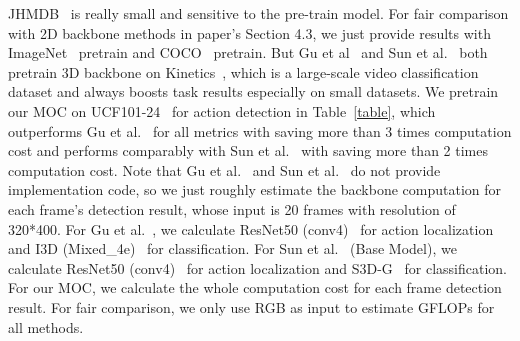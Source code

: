 \documentclass[runningheads]{llncs}
\begin{document}
JHMDB~\cite{JHMDB} is really small and sensitive to the pre-train model. For fair comparison with 2D backbone methods in paper's Section 4.3, we just provide results with ImageNet~\cite{deng2009imagenet} pretrain and COCO~\cite{lin2014microsoft} pretrain. But Gu et al~\cite{gu2018ava} and Sun et al.~\cite{SunSVMSS18} both pretrain 3D backbone on Kinetics~\cite{carreira2017quo}, which is a large-scale video classification dataset and always boosts task results especially on small datasets. We pretrain our MOC on UCF101-24~\cite{UCF101} for action detection in Table~\ref{table}, which outperforms Gu et al.~\cite{gu2018ava} for all metrics with saving more than 3 times computation cost and performs comparably with Sun et al.~\cite{SunSVMSS18} with saving more than 2 times computation cost. Note that Gu et al.~\cite{gu2018ava} and Sun et al.~\cite{SunSVMSS18} do not provide implementation code, so we just roughly estimate the backbone computation for each frame's detection result, whose input is 20 frames with resolution of 320*400. For Gu et al.~\cite{gu2018ava}, we calculate ResNet50 (conv4)~\cite{he2016deep} for action localization and I3D (Mixed\_4e)~\cite{carreira2017quo} for classification. For Sun et al.~\cite{SunSVMSS18} (Base Model), we calculate ResNet50 (conv4)~\cite{he2016deep} for action localization and S3D-G~\cite{xie2018rethinking} for classification. For our MOC, we calculate the whole computation cost for each frame detection result. For fair comparison, we only use RGB as input to estimate GFLOPs for all methods.



\end{document}
